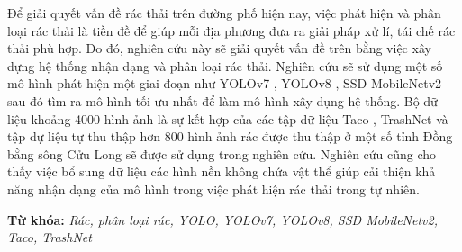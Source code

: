 \documentclass[./thesis.tex]{subfiles}
\begin{document}

{\fontsize{13}{12} \selectfont
Để giải quyết vấn đề rác thải trên đường phố hiện nay, việc phát hiện và phân loại rác thải là tiền đề để giúp mỗi địa phương đưa ra giải pháp xử lí, tái chế rác thải phù hợp.
Do đó, nghiên cứu này sẽ giải quyết vấn đề trên bằng việc xây dựng hệ thống nhận dạng và phân loại rác thải. Nghiên cứu sẽ sử dụng một số mô hình phát hiện một giai đoạn
như YOLOv7 \cite{wang2022yolov7}, YOLOv8 \cite{YOLOv8}, SSD MobileNetv2 \cite{Liu_2016} \cite{sandler2019mobilenetv2} sau đó tìm ra mô hình tối ưu nhất để làm mô hình xây dụng hệ thống.
Bộ dữ liệu khoảng 4000 hình ảnh là sự kết hợp của các tập dữ liệu Taco \cite{proença2020taco}, TrashNet \cite{yang2016classification} và tập dự liệu tự thu thập hơn 800 hình ảnh rác được thu thập ở một số tỉnh Đồng bằng sông Cửu Long sẽ được sử dụng trong nghiên cứu.
Nghiên cứu cũng cho thấy việc bổ sung dữ liệu các hình nền không chứa vật thể giúp cải thiện khả năng nhận dạng của mô hình trong việc phát hiện rác thải trong tự nhiên.
}
\bigskip



{\bf Từ khóa:} \textit{Rác, phân loại rác, YOLO, YOLOv7, YOLOv8, SSD MobileNetv2, Taco, TrashNet}
\end{document}
